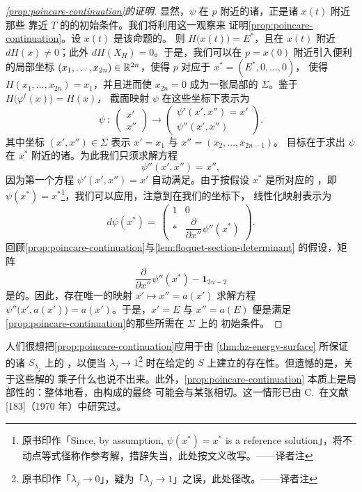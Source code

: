 \begin{proof}[\cref*{prop:poincare-continuation}的证明]
显然，$\psi$ 在 $p$ 附近的诸\trFixedPoint{}，正是诸\trReferenceSolution{} $x(t)$ 附近那些%
\trPeriodic{}靠近 $T$ 的\trPeriodicSolution{}的初始条件。我们将利用这一观察来%
证明\cref{prop:poincare-continuation}。设 $x(t)$ 是该命题的\trPeriodicSolution。%
则 $H\bigl(x(t)\bigr)=E^{*}$，且在 $x(t)$ 附近 $dH(x)\neq0$；此外%
$dH(X_{H})=0$。于是，我们可以在 $p=x(0)$ 附近引入便利的局部坐标%
$(x_{1},\dots,x_{2n})\in\mathbb{R}^{2n}$，使得 $p$ 对应于 $x^{*}=(E^{*},0,\dots,0)$，%
使得 $H(x_{1},\dots,x_{2n})=x_{1}$，并且进而使 $x_{2n}=0$ 成为一张局部的%
\trTransversalSection{} $\Sigma$。鉴于 $H\bigl(\varphi^{t}(x)\bigr)=H(x)$，%
截面映射 $\psi$ 在这些坐标下表示为
\[
\psi\ :\ \left(\begin{array}{c} x'\\ x'' \end{array}\right)
\longrightarrow\left(\begin{array}{c} \psi'(x',x'')=x'\\ \psi''(x',x'') \end{array}\right).
\]
其中坐标 $(x',x'')\in\Sigma$ 表示 $x'=x_{1}$ 与 $x''=(x_{2},\dots,x_{2n-1})$。%
目标在于求出 $\psi$ 在 $x^{*}$ 附近的诸\trFixedPoint。为此我们只须求解方程
\[
\psi''(x',x'')=x'',
\]
因为第一个方程 $\psi'(x',x'')=x'$ 自动满足。由于按假设 $x^{*}$ 是\trReferenceSolution{}所对应的%
\trFixedPoint，即 $\psi(x^{*})=x^{*}$\footnote{原书印作「Since, by assumption, $\psi(x^{*})=x^{*}$ is a reference solution」，将不动点等式径称作参考解，措辞失当，此处按文义改写。——译者注}，我们可以应用\trImplicitFunctionTheorem，注意到在我们的坐标下，%
线性化映射表示为
\[
d\psi(x^{*})=\ \left(\begin{array}{c|c}
1 & 0\\
\hline
* & \dfrac{\partial}{\partial x''}\psi''(x^{*})
\end{array}\right).
\]
回顾\cref{prop:poincare-continuation}与\cref{lem:floquet-section-determinant}%
的假设，矩阵
\[
\frac{\partial}{\partial x''}\psi''(x^{*})-\mathbf{1}_{2n-2}
\]
是\trNonsingular{}的。因此，存在唯一的映射 $x'\mapsto x''=a(x')$ 求解方程%
$\psi''\bigl(x',a(x')\bigr)=a(x')$。于是，$x'=E$ 与 $x''=a(E)$ 便是满足%
\cref{prop:poincare-continuation}的那些所需\trPeriodicSolution{}在 $\Sigma$ 上的%
初始条件。
\end{proof}

人们很想把\cref{prop:poincare-continuation}应用于由%
\cref{thm:hz-energy-surface} 所保证的诸 $S_{\lambda_{j}}$ 上的%
\trPeriodicSolution，以便当 $\lambda_{j}\to1$\footnote{原书印作「$\lambda_{j}\to 0$」，疑为「$\lambda_{j}\to 1$」之误，此处径改。——译者注} 时在给定的\trEnergySurface{}%
$S$ 上建立\trPeriodicSolution{}的存在性。但遗憾的是，关于这些解的%
\trFloquet{}乘子什么也说不出来。此外，\cref{prop:poincare-continuation}%
本质上是局部性的：整体地看，由\trPeriodicSolution{}构成的\trCylinder{}最终%
可能会与某张\trEnergySurface{}相切。这一情形已由 C.~\trRobinson{}在文献%
[183]（1970 年）中研究过。
